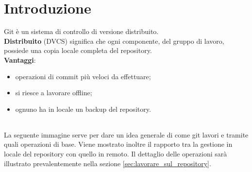 %



\section{Introduzione} %
\label{sec:introduzione}
Git è un sistema di controllo di versione distribuito. \\
\textbf{Distribuito} (DVCS) significa che ogni componente, del gruppo di lavoro, possiede una copia locale completa del repository. \\

\noindent
\textbf{Vantaggi}:
	\begin{itemize}
		\item operazioni di commit più veloci da effettuare;
		\item si riesce a lavorare offline;
		\item ognuno ha in locale un backup del repository.
	\end{itemize}
	\noindent
	\\
La seguente immagine serve per dare un idea generale di come git lavori e tramite quali operazioni di base. Viene mostrato inoltre il rapporto tra la gestione in locale del repository con quello in remoto. Il dettaglio delle operazioni sarà illustrato prevalentemente nella sezione \ref{sec:lavorare_sul_repository}.

